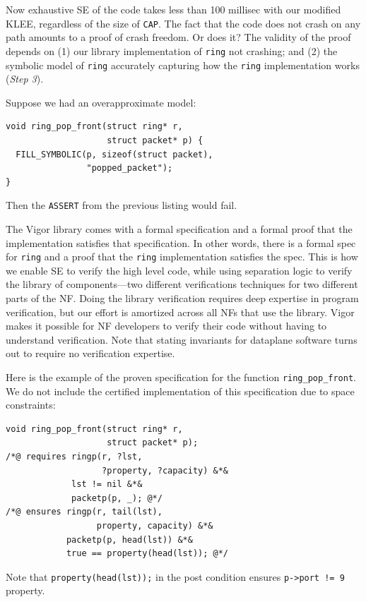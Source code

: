 \documentclass[letterpaper,twocolumn,10pt]{article}
\newcommand{\code}[1]{\lstinline{#1}}
\begin{document}
Now exhaustive SE of the code takes less than 100 millisec with our modified
KLEE, regardless of the size of \code{CAP}.  The fact that the code does not
crash on any path amounts to a proof of crash freedom. Or does it? The validity
of the proof depends on (1)  our library implementation of \code{ring} not
crashing; and (2) the symbolic model of \code{ring} accurately capturing how the
\code{ring} implementation works ({\em Step 3}).

Suppose we had an overapproximate model:
\begin{lstlisting}
void ring_pop_front(struct ring* r,
                    struct packet* p) {
  FILL_SYMBOLIC(p, sizeof(struct packet),
                "popped_packet");
}
\end{lstlisting}
Then the \code{ASSERT} from the previous listing would fail.

The Vigor library comes with a formal specification and a formal proof that the implementation satisfies that specification. In other words, there is a formal spec for \code{ring} and a proof that the \code{ring} implementation satisfies the spec. This is how we enable SE to verify the high level code, while using separation logic to verify the library of components---two different verifications techniques for two different parts of the NF. Doing the library verification requires deep expertise in program verification, but our effort is amortized across all NFs that use the library. Vigor makes it possible for NF developers to verify their code without having to understand verification. Note that stating invariants for dataplane software turns out to require no verification expertise.

Here is the example of the proven specification for the function
\code{ring_pop_front}. We do not include the certified implementation of this
specification due to space constraints:

\begin{lstlisting}
void ring_pop_front(struct ring* r,
                    struct packet* p);
/*@ requires ringp(r, ?lst,
                   ?property, ?capacity) &*&
             lst != nil &*&
             packetp(p, _); @*/
/*@ ensures ringp(r, tail(lst),
                  property, capacity) &*&
            packetp(p, head(lst)) &*&
            true == property(head(lst)); @*/
\end{lstlisting}

Note that \code{property(head(lst));} in the post condition ensures \code{p->port != 9} property.
\end{document}
